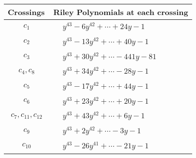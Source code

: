 \documentclass[1p]{elsarticle_modified}
\theoremstyle{definition}
\begin{document}
\begin{tabular}{m{50pt}|m{274pt}}
Crossings & \hspace{64pt}Riley Polynomials at each crossing \\
\hline $$\begin{aligned}c_{1}\end{aligned}$$&$\begin{aligned}
&y^{43}-6 y^{42}+\cdots+24 y-1
\end{aligned}$\\
\hline $$\begin{aligned}c_{2}\end{aligned}$$&$\begin{aligned}
&y^{43}-13 y^{42}+\cdots+40 y-1
\end{aligned}$\\
\hline $$\begin{aligned}c_{3}\end{aligned}$$&$\begin{aligned}
&y^{43}+30 y^{42}+\cdots-441 y-81
\end{aligned}$\\
\hline $$\begin{aligned}c_{4},c_{8}\end{aligned}$$&$\begin{aligned}
&y^{43}+34 y^{42}+\cdots-28 y-1
\end{aligned}$\\
\hline $$\begin{aligned}c_{5}\end{aligned}$$&$\begin{aligned}
&y^{43}-17 y^{42}+\cdots+44 y-1
\end{aligned}$\\
\hline $$\begin{aligned}c_{6}\end{aligned}$$&$\begin{aligned}
&y^{43}+23 y^{42}+\cdots+20 y-1
\end{aligned}$\\
\hline $$\begin{aligned}c_{7},c_{11},c_{12}\end{aligned}$$&$\begin{aligned}
&y^{43}+43 y^{42}+\cdots+6 y-1
\end{aligned}$\\
\hline $$\begin{aligned}c_{9}\end{aligned}$$&$\begin{aligned}
&y^{43}+2 y^{42}+\cdots-3 y-1
\end{aligned}$\\
\hline $$\begin{aligned}c_{10}\end{aligned}$$&$\begin{aligned}
&y^{43}-26 y^{41}+\cdots-21 y-1
\end{aligned}$\\
\hline
\end{tabular}\\~\\
\end{document}
